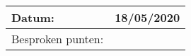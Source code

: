 \begin{tabularx}{\textwidth}{| l | X |}
  \hline
  Datum: & 18/05/2020\\
  \hline
  Besproken punten: &
  \begin{compactitem}
    \item \hl{}
    \item \hl{}
    \item \hl{}
  \end{compactitem}\\
  \hline
\end{tabularx}